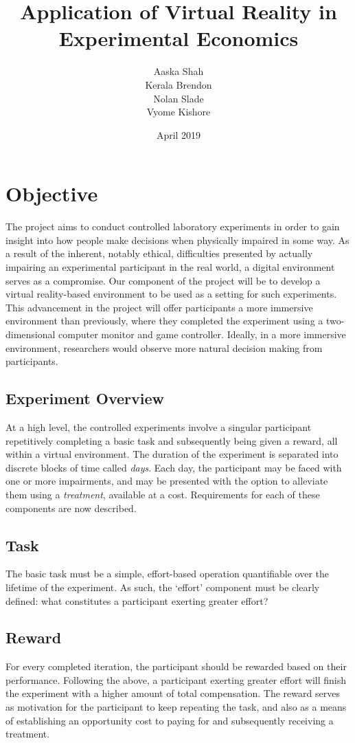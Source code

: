 \documentclass{article}
\title{Application of Virtual Reality in Experimental Economics}
\author{Aaska Shah\\Kerala Brendon\\Nolan Slade\\Vyome Kishore}
\date{April 2019}
\begin{document}
\maketitle
 
\newpage

\tableofcontents

\newpage

\section{Objective}
The project aims to conduct controlled laboratory experiments in order to gain insight into how people make decisions when physically impaired in some way. As a result of the inherent, notably ethical, difficulties presented by actually impairing an experimental participant in the real world, a digital environment serves as a compromise. Our component of the project will be to develop a virtual reality-based environment to be used as a setting for such experiments. This advancement in the project will offer participants a more immersive environment than previously, where they completed the experiment using a two-dimensional computer monitor and game controller. Ideally, in a more immersive environment, researchers would observe more natural decision making from participants.

\subsection{Experiment Overview}
At a high level, the controlled experiments involve a singular participant repetitively completing a basic task and subsequently being given a reward, all within a virtual environment. The duration of the experiment is separated into discrete blocks of time called \textit{days}. Each day, the participant may be faced with one or more impairments, and may be presented with the option to alleviate them using a \textit{treatment}, available at a cost. Requirements for each of these components are now described.

\subsection{Task}
The basic task must be a simple, effort-based operation quantifiable over the lifetime of the experiment. As such, the ‘effort’ component must be clearly defined: what constitutes a participant exerting greater effort? 


\subsection{Reward}
For every completed iteration, the participant should be rewarded based on their performance. Following the above, a participant exerting greater effort will finish the experiment with a higher amount of total compensation. The reward serves as motivation for the participant to keep repeating the task, and also as a means of establishing an opportunity cost to paying for and subsequently receiving a treatment. 
\end{document}
